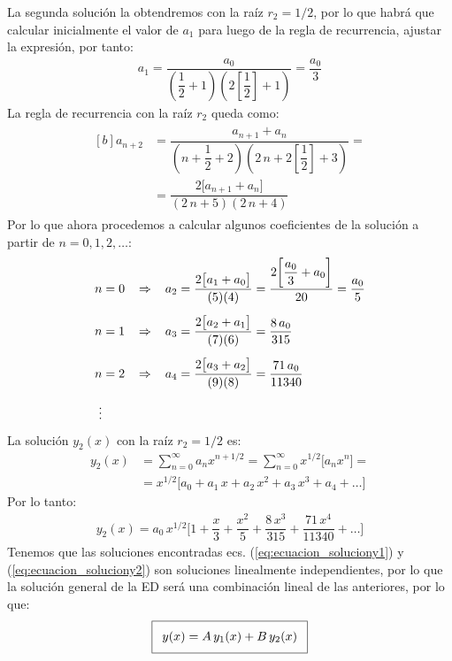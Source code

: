 La segunda solución la obtendremos con la raíz $r_{2} = 1/2$, por lo que habrá que calcular inicialmente el valor de $a_{1}$ para luego de la regla de recurrencia, ajustar la expresión, por tanto:
\begin{align}
a_{1} = \dfrac{a_{0}}{\left( \dfrac{1}{2} + 1 \right)\left( 2 \left[ \dfrac{1}{2} \right] + 1 \right) } = \dfrac{a_{0}}{3}
\label{eq:ecuacion_coeficientea1_r2}
\end{align}
La regla de recurrencia con la raíz $r_{2}$ queda como:
\begin{align}
\begin{aligned}[b]
a_{n+2} &= \dfrac{a_{n+1} + a_{n}}{\left( n + \dfrac{1}{2} + 2 \right) \left( 2 \, n + 2 \left[ \dfrac{1}{2}\right] + 3 \right)} = \\[0.5em]
&= \dfrac{2 \big[ a_{n+1} + a_{n} \big]}{(2 \, n + 5)(2 \, n + 4)}
\end{aligned}
\label{eq:ecuacion_reglarecurrencia_r2}
\end{align}
Por lo que ahora procedemos a calcular algunos coeficientes de la solución a partir de $n = 0, 1, 2, \ldots$:
\begin{align*}
n &= 0 \hspace{0.3cm} \Rightarrow \hspace{0.3cm} a_{2} = \dfrac{2 \big[ a_{1} + a_{0} \big]}{(5)(4)} = \dfrac{2 \bigg[ \dfrac{a_{0}}{3} + a_{0} \bigg]}{20} = \dfrac{a_{0}}{5}
\\[0.5em]
n &= 1 \hspace{0.3cm} \Rightarrow \hspace{0.3cm} a_{3} = \dfrac{2 \big[ a_{2} + a_{1} \big]}{(7)(6)} =  \dfrac{8 \, a_{0}}{315} \\[0.5em]
n &= 2 \hspace{0.3cm} \Rightarrow \hspace{0.3cm} a_{4} = \dfrac{2 \big[ a_{3} + a_{2} \big]}{(9)(8)} = \dfrac{71 \, a_{0}}{11340} \\[0.5em]
\vdots
\end{align*}
La solución $y_{2}(x)$ con la raíz $r_{2} = 1/2$ es:
\begin{align*}
y_{2}(x) &= \sum_{n=0}^{\infty} a_{n} x^{n+1/2} =  \sum_{n=0}^{\infty} x^{1/2} \bigg[ a_{n} x^{n} \bigg] = \\[0.5em]
&= x^{1/2} \bigg[ a_{0} + a_{1} \, x + a_{2} \, x^{2} + a_{3} \, x^{3} + a_{4} + \ldots \bigg]
\end{align*}
Por lo tanto:
\begin{align}
y_{2}(x) = a_{0} \, x^{1/2} \bigg[ 1 + \dfrac{x}{3} + \dfrac{x^{2}}{5}  + \dfrac{8 \, x^{3}}{315} + \dfrac{71 \, x^{4}}{11340} + \ldots \bigg]
\label{eq:ecuacion_soluciony2}
\end{align}
Tenemos que las soluciones encontradas ecs. (\ref{eq:ecuacion_soluciony1}) y (\ref{eq:ecuacion_soluciony2}) son soluciones linealmente independientes, por lo que la solución general de la ED será una combinación lineal de las anteriores, por lo que:
\begin{align*}
\addtolength{\fboxsep}{5pt}\boxed{
y(x) = A \, y_{1}(x) + B \, y_{2}(x) }
\end{align*}    
